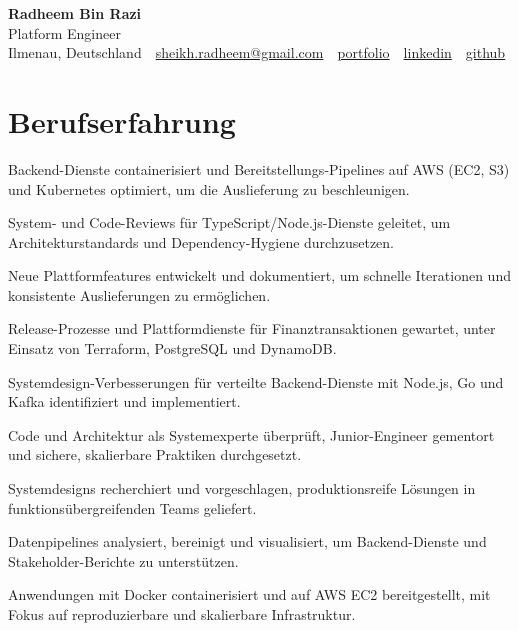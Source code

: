 \documentclass[11pt,a4paper]{resume}
\makeatletter
\newcommand{\Portfolio}{https://radheem.github.io/my-cv}
\newcommand{\PortfolioText}{portfolio}
\newcommand{\GitHub}{https://github.com/radheem}
\newcommand{\LinkedIn}{https://www.linkedin.com/in/radheem-razi}
\newcommand{\Email}{sheikh.radheem@gmail.com}
\makeatother
\begin{document}
\clearpage
{}

\begin{center}
  {\huge\bfseries Radheem Bin Razi}\\[3pt]
  {\large Platform Engineer}\\[6pt]
  \small
  Ilmenau, Deutschland \,\textbar\,
  \href{mailto:\Email}{\Email} \,\textbar\,
  \href{\Portfolio}{\PortfolioText} \,\textbar\,
  \href{\LinkedIn}{linkedin} \,\textbar\,
  \href{\GitHub}{github}
\end{center}
\vspace{2pt}

\section{Berufserfahrung}

\bullets
  \item Backend-Dienste containerisiert und Bereitstellungs-Pipelines auf AWS (EC2, S3) und Kubernetes optimiert, um die Auslieferung zu beschleunigen.
  \item System- und Code-Reviews für TypeScript/Node.js-Dienste geleitet, um Architekturstandards und Dependency-Hygiene durchzusetzen.
  \item Neue Plattformfeatures entwickelt und dokumentiert, um schnelle Iterationen und konsistente Auslieferungen zu ermöglichen.
\bulletsend
\vspace{3pt}
\bullets
  \item Release-Prozesse und Plattformdienste für Finanztransaktionen gewartet, unter Einsatz von Terraform, PostgreSQL und DynamoDB.
  \item Systemdesign-Verbesserungen für verteilte Backend-Dienste mit Node.js, Go und Kafka identifiziert und implementiert.
  \item Code und Architektur als Systemexperte überprüft, Junior-Engineer gementort und sichere, skalierbare Praktiken durchgesetzt.
\bulletsend
\vspace{3pt}
\bullets
  \item Systemdesigns recherchiert und vorgeschlagen, produktionsreife Lösungen in funktionsübergreifenden Teams geliefert.
  \item Datenpipelines analysiert, bereinigt und visualisiert, um Backend-Dienste und Stakeholder-Berichte zu unterstützen.
  \item Anwendungen mit Docker containerisiert und auf AWS EC2 bereitgestellt, mit Fokus auf reproduzierbare und skalierbare Infrastruktur.
\bulletsend
\vspace{3pt}
\end{document}
